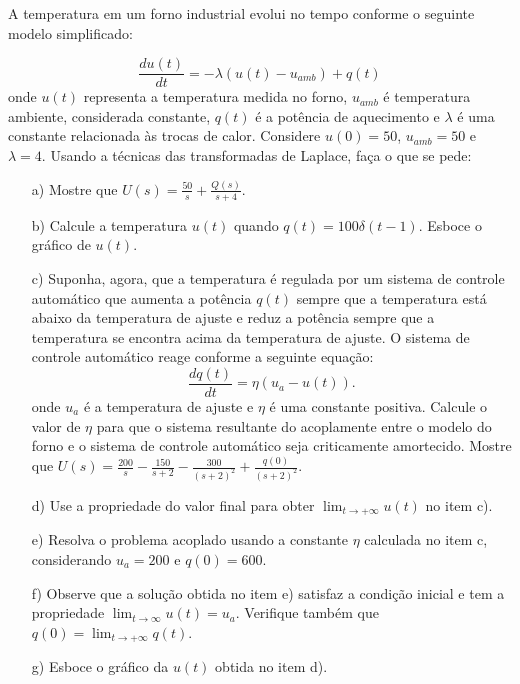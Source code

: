 \begin{Exercise}A temperatura em um forno industrial evolui no tempo conforme o seguinte modelo simplificado:

$$\frac{d u(t)}{dt}=-\lambda (u(t)-u_{amb}) + q(t)$$
onde $u(t)$ representa a temperatura medida no forno, $u_{amb}$ é temperatura ambiente, considerada constante, $q(t)$ é a potência de aquecimento e $\lambda$ é uma constante relacionada às trocas de calor. Considere $u(0)=50$, $u_{amb}=50$ e $\lambda=4$. Usando a técnicas das transformadas de Laplace, faça o que se pede:
\begin{itemize}
 \item [a)] Mostre que $U(s)=\frac{50}{s}+\frac{Q(s)}{s+4}$.
 \item [b)] Calcule a temperatura $u(t)$ quando  $q(t)=100 \delta(t-1)$. Esboce o gráfico de $u(t)$.
 \item [c)] Suponha, agora, que a temperatura é regulada por um sistema de controle automático que aumenta a potência $q(t)$ sempre que a temperatura está abaixo da temperatura de ajuste e reduz a potência sempre que a temperatura se encontra acima da temperatura de ajuste. O sistema de controle automático reage conforme a seguinte equação:
 $$\frac{dq(t)}{dt} = \eta (u_a-u(t)).$$
 onde $u_a$ é a temperatura de ajuste e $\eta$ é uma constante positiva. Calcule o valor de $\eta$ para que o sistema resultante do acoplamente entre o modelo do forno e o sistema de controle automático seja criticamente amortecido. Mostre que $U(s)=\frac{200}{s}-\frac{150}{s+2}-\frac{300}{(s+2)^2}+\frac{q(0)}{(s+2)^2}$.
 \item[d)] Use a propriedade do valor final para obter $\displaystyle\lim_{t\to+\infty} u(t)$ no item c).
 \item[e)] Resolva o problema acoplado usando a constante $\eta$ calculada no item c, considerando $u_a=200$ e $q(0)=600$.
  \item[f)] Observe que a solução obtida no item e) satisfaz a condição inicial e tem a propriedade $\displaystyle\lim_{t\to \infty}u(t)=u_a$. Verifique também que $q(0)=\lim_{t\to+\infty} q(t)$.
 \item [g)] Esboce o gráfico da $u(t)$ obtida no item d).
 \end{itemize}
\end{Exercise}
